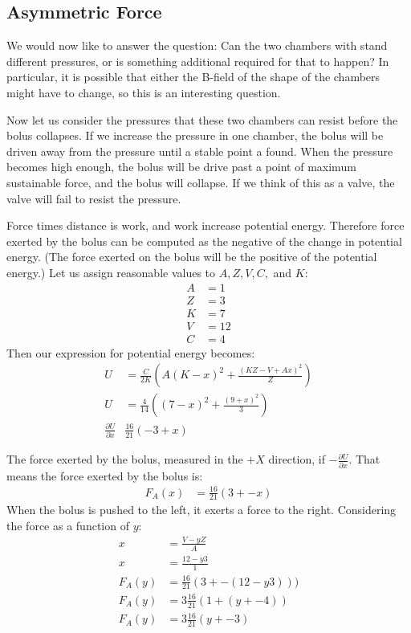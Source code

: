 \documentclass{asme2ej}
\begin{document}
\subsection{Asymmetric Force}

We would now like to answer the question: Can the two chambers with stand
different pressures, or is something additional required for that to happen?
In particular, it is possible that either the B-field of the shape of the chambers
might have to change, so this is an interesting question.

Now let us consider the pressures that these two chambers can resist before
the bolus collapses. If we increase the pressure in one chamber, the
bolus will be driven away from the pressure until a stable point a found.
When the pressure becomes high enough, the bolus will be drive past a point
of maximum sustainable force, and the bolus will collapse. If we think
of this as a valve, the valve will fail to resist the pressure.

Force times distance is work, and work increase potential energy.
Therefore force exerted by the bolus can be computed as the negative of the change in potential energy.
(The force exerted on the bolus will be the positive of the potential energy.)
Let us assign reasonable values to $A,Z,V,C,$ and $K$:
\begin{align}
  A &= 1 \\
  Z &= 3 \\
  K &= 7 \\
  V &= 12 \\
  C &= 4
\end{align}
Then our expression for potential energy becomes:
\begin{align}
  U &= \frac{C}{2K} \left( A  (K - x)^2 + \frac{(K Z - V + A x)^2}{Z} \right) \\
  U &= \frac{4}{14} \left(   (7 - x)^2 + \frac{(9 +  x)^2}{3} \right) \\
  \frac{\partial U}{\partial x} & \frac{16}{21} (-3 + x)
  \end{align}

The force exerted by the bolus, measured in the $+X$ direction, if $-\frac{\partial U}{\partial x}$.
That means the force exerted by the bolus is:
\begin{align}
  F_A(x) &= \frac{16}{21} (3 + -x)
\end{align}
When the bolus is pushed to the left, it exerts a force to the right.
Considering the force as a function of $y$:
\begin{align}
  x &= \frac{V - yZ }{A} \\
  x &= \frac{12 - y3 }{1} \\
  F_A(y) &= \frac{16}{21} (3 + -(12 - y3))) \\
  F_A(y) &= 3\frac{16}{21} (1 + (y + -4)) \\
  F_A(y) &= 3\frac{16}{21} (y + -3) \\
\end{align}
\end{document}
